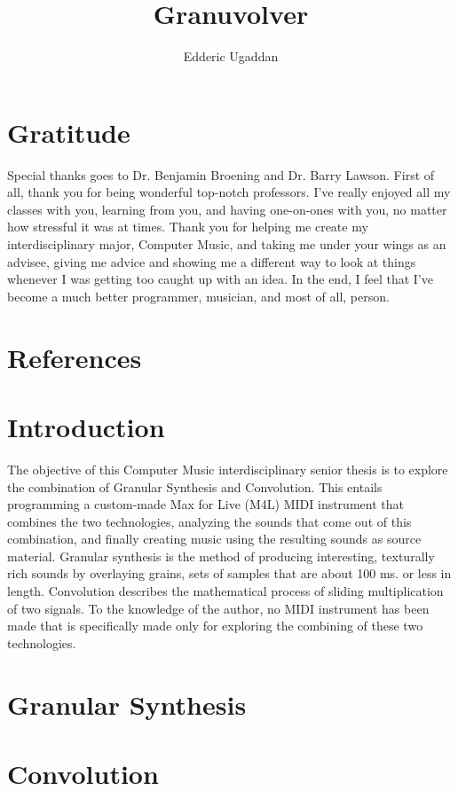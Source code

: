 \documentclass{article}
\author{Edderic Ugaddan}
\title{Granuvolver}
\begin{document}
\maketitle
\tableofcontents
\section{Gratitude}
	Special thanks goes to Dr. Benjamin Broening and Dr. Barry Lawson. First of all, thank you for being wonderful top-notch professors. I've really enjoyed all my classes with you, learning from you, and having one-on-ones with you, no matter how stressful it was at times. Thank you for helping me create my interdisciplinary major, Computer Music, and taking me under your wings as an advisee, giving me advice and showing me a different way to look at things whenever I was getting too caught up with an idea.  In the end, I feel that I've become a much better programmer, musician, and most of all, person.
\section{References}


\section{Introduction}

	The objective of this Computer Music interdisciplinary senior thesis is to explore the combination of Granular Synthesis and Convolution. This entails programming a custom-made Max for Live (M4L) MIDI instrument that combines the two technologies, analyzing the sounds that come out of this combination, and finally creating music using the resulting sounds as source material. Granular synthesis is the method of producing interesting, texturally rich sounds by overlaying grains, sets of samples that are about 100 ms. or less in length. Convolution describes the mathematical process of sliding multiplication of two signals.   To the knowledge of the author, no MIDI instrument has been made that is specifically made only for exploring the combining of these two technologies.
	

\section{Granular Synthesis}
\section{Convolution}
\end{document}
